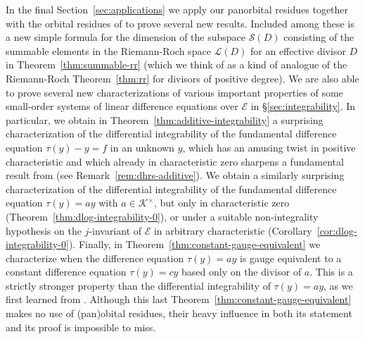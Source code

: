 \documentclass[preprint,12pt]{elsarticle}
\numberwithin{equation}{section} %
\theoremstyle{theorem}
\theoremstyle{definition}
\newcommand{\Ca}{\mathcal{C}} %
\newcommand{\bk}{\mathcal{K}} %
\newcommand{\ec}{\mathcal{E}} %
\begin{document}
In the final Section~\ref{sec:applications} we apply our panorbital residues together with the orbital residues of \cite{Dreyfus2018} to prove several new results. Included among these is a new simple formula for the dimension of the subspace $\mathcal{S}(D)$ consisting of the summable elements in the Riemann-Roch space $\mathcal{L}(D)$ for an effective divisor $D$ in Theorem~\ref{thm:summable-rr} (which we think of as a kind of analogue of the Riemann-Roch Theorem~\ref{thm:rr} for divisors of positive degree). We are also able to prove several new characterizations of various important properties of some small-order systems of linear difference equations over $\ec$ in \S\ref{sec:integrability}. In particular, we obtain in Theorem~\ref{thm:additive-integrability} a surprising characterization of the differential integrability of the fundamental difference equation $\tau(y)-y=f$ in an unknown $y$, which has an amusing twist in positive characteristic and which already in characteristic zero sharpens a fundamental result from \cite{Dreyfus2018} (see Remark~\ref{rem:dhrs-additive}). We obtain a similarly surprising characterization of the differential integrability of the fundamental difference equation $\tau(y)=ay$ with $a\in\bk^\times$, but only in characteristic zero (Theorem~\ref{thm:dlog-integrability-0}), or under a suitable non-integrality hypothesis on the $j$-invariant of $\ec$ in arbitrary characteristic (Corollary~\ref{cor:dlog-integrability-0}). Finally, in Theorem~\ref{thm:constant-gauge-equivalent} we characterize when the difference equation $\tau(y)=ay$ is gauge equivalent to a constant difference equation $\tau(y)=cy$ based only on the divisor of $a$. This is a strictly stronger property than the differential integrability of $\tau(y)=ay$, as we first learned from \cite{hardouin-roques:2023}. Although this last Theorem~\ref{thm:constant-gauge-equivalent} makes no use of (pan)obital residues, their heavy influence in both its statement and its proof is impossible to miss.

\end{document}
